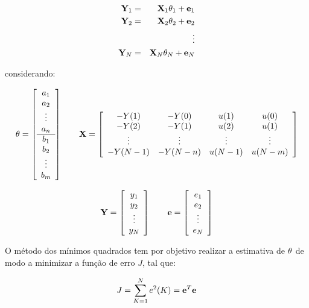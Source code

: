 \begin{eqnarray}
\mathbf{Y}_1 & = & \mathbf{X}_1\mathbf{\theta}_1 + \mathbf{e}_1\nonumber\\
\mathbf{Y}_2 & = & \mathbf{X}_2\mathbf{\theta}_2 + \mathbf{e}_2\nonumber\\
& & \vdots\nonumber\\ 
\mathbf{Y}_N & = & \mathbf{X}_N\mathbf{\theta}_N + \mathbf{e}_N\nonumber\\
\end{eqnarray}

\noindent considerando:

\begin{equation*}
\mathbf{\theta} = \left[
\begin{array}{c}
a_1\\
a_2\\
\vdots\\
a_n\\
\hline
b_1\\
b_2\\
\vdots\\
b_m
\end{array}
\right] \qquad
\mathbf{X} = \left[
\begin{array}{cccc}
-Y(1) & -Y(0) & u(1) & u(0)\\
-Y(2) & -Y(1) & u(2) & u(1)\\
\vdots & \vdots & \vdots & \vdots\\
-Y(N-1) & -Y(N-n) & u(N-1) & u(N-m)
\end{array}
\right]
\end{equation*}

\begin{equation*}
\mathbf{Y} = \left[
\begin{array}{c}
y_1\\
y_2\\
\vdots\\
y_N
\end{array}
\right] \qquad
\mathbf{e} = \left[
\begin{array}{c}
e_1\\
e_2\\
\vdots\\
e_N
\end{array}
\right]
\end{equation*}

O método dos mínimos quadrados tem por objetivo realizar a estimativa de
$\mathbf{\theta}$ de modo a minimizar a função de erro $J$, tal que:

\begin{equation}
J = \sum_{K = 1}^N e^2(K) = \mathbf{e}^T\mathbf{e}
\end{equation}

